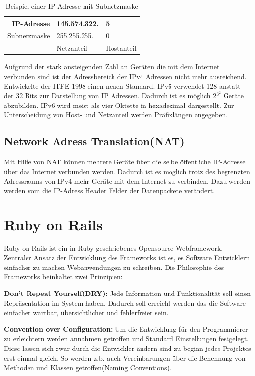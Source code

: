 \begin{table}
\begin{center}
\caption{Beispiel einer IP Adresse mit Subnetzmaske}
\begin{tabular}{|r|l|l|}
	\hline
	IP-Adresse & 145.574.322. & 5 \\ \hline
	Subnetzmaske & 255.255.255. & 0 \\ \hline
	& Netzanteil & Hostanteil \\
	\hline
\end{tabular}
\end{center}
\end{table}


Aufgrund der stark ansteigenden Zahl an Geräten die mit dem Internet verbunden sind ist der Adressbereich der IPv4 Adressen nicht mehr ausreichend. Entwickelte der ITFE 1998 einen neuen Standard. IPv6 verwendet 128 anstatt der 32 Bits zur Darstellung von IP Adressen. Dadurch ist es möglich 2$^3^2$ Geräte abzubilden. IPv6 wird meist als vier Oktette in hexadezimal dargestellt. Zur Unterscheidung von Host- und Netzanteil werden Präfixlängen angegeben.  

\subsection{Network Adress Translation(NAT)}
Mit Hilfe von NAT können mehrere Geräte über die selbe öffentliche IP-Adresse über das Internet verbunden werden. Dadurch ist es möglich trotz des begrenzten Adressraums von IPv4 mehr Geräte mit dem Internet zu verbinden. Dazu werden werden vom die IP-Adress Header Felder der Datenpackete verändert. 

\section{Ruby on Rails}
Ruby on Rails ist ein in Ruby geschriebenes Opensource Webframework. Zentraler Ansatz der Entwicklung des Frameworks ist es, es Software Entwicklern einfacher zu machen Webanwendungen zu schreiben. Die Philosophie des Frameworks beinhaltet zwei Prinzipien\cite{ror-guide}:

\textbf{Don't Repeat Yourself(DRY):}
Jede Information und Funktionalität soll einen Repräsentation im System haben. Dadurch soll erreicht werden das die Software einfacher wartbar, über­sicht­licher und fehlerfreier sein.
 
\textbf{Convention over Configuration:}
Um die Entwicklung für den Programmierer zu erleichtern werden annahmen getroffen und Standard Einstellungen festgelegt. Diese lassen sich zwar durch die Entwickler ändern sind zu beginn jedes Projektes erst einmal gleich. So werden z.b. auch Vereinbarungen über die Benennung von Methoden und Klassen getroffen(Naming Conventions).

